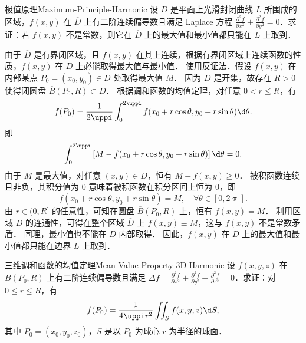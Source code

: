 \begin{problem}{极值原理}{Maximum-Principle-Harmonic}
    设 $D$ 是平面上光滑封闭曲线 $L$ 所围成的区域，$f(x,y)$ 在 $\overline{D}$ 上有二阶连续偏导数且满足 Laplace 方程 $\frac{\partial^2 f}{\partial x^2} + \frac{\partial^2 f}{\partial y^2} = 0$．求证：若 $f(x,y)$ 不是常数，则它在 $\overline{D}$ 上的最大值和最小值都只能在 $L$ 上取到．
\end{problem}

\begin{myproof}
    由于 $\overline{D}$ 是有界闭区域，且 $f(x,y)$ 在其上连续，根据有界闭区域上连续函数的性质，$f(x,y)$ 在 $\overline{D}$ 上必能取得最大值与最小值．
    使用反证法．假设 $f(x,y)$ 在内部某点 $P_0 = (x_0, y_0) \in D$ 处取得最大值 $M$．
    因为 $D$ 是开集，故存在 $R > 0$ 使得闭圆盘 $\overline{B}(P_0, R) \subset D$．
    根据调和函数的均值定理，对任意 $0 < r \le R$，有
    \begin{equation}
        \label{eq:mean-value-proof}
        f(P_0) = \frac{1}{2\uppi} \int_{0}^{2\uppi} f(x_0 + r \cos \theta, y_0 + r \sin \theta) \d \theta.
    \end{equation}
    即
    \begin{equation}
        \label{eq:integral-diff}
        \int_{0}^{2\uppi} \left[ M - f(x_0 + r \cos \theta, y_0 + r \sin \theta) \right] \d \theta = 0.
    \end{equation}
    由于 $M$ 是最大值，对任意 $(x,y) \in \overline{D}$，恒有 $M - f(x,y) \ge 0$．
    被积函数连续且非负，其积分值为 $0$ 意味着被积函数在积分区间上恒为 $0$，即
    \begin{equation}
        f(x_0 + r \cos \theta, y_0 + r \sin \theta) = M, \quad \forall \theta \in [0, 2\uppi].
    \end{equation}
    由 $r \in (0, R]$ 的任意性，可知在圆盘 $\overline{B}(P_0, R)$ 上，恒有 $f(x,y) = M$．
    利用区域 $D$ 的连通性，可得在整个区域 $\overline{D}$ 上 $f(x,y) \equiv M$，这与 $f(x,y)$ 不是常数矛盾．
    同理，最小值也不能在 $D$ 内部取得．
    因此，$f(x,y)$ 在 $\overline{D}$ 上的最大值和最小值都只能在边界 $L$ 上取到．
\end{myproof}

\begin{problem}{三维调和函数的均值定理}{Mean-Value-Property-3D-Harmonic}
    设 $f(x, y, z)$ 在 $\overline{B}(P_0, R)$ 上有二阶连续偏导数且满足 $\Delta f = \frac{\partial^2 f}{\partial x^2} + \frac{\partial^2 f}{\partial y^2} + \frac{\partial^2 f}{\partial z^2} = 0$．求证：对 $0 \le r \le R$，有
    \begin{equation*}
        f(P_0) = \frac{1}{4 \uppi r^2} \iint_{S} f(x, y, z) \d S,
    \end{equation*}
    其中 $P_0 = (x_0, y_0, z_0)$，$S$ 是以 $P_0$ 为球心 $r$ 为半径的球面．
\end{problem}

